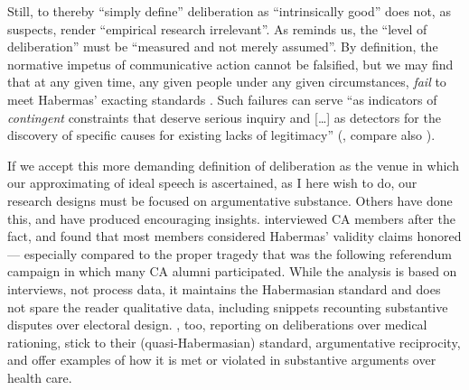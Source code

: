 Still, to thereby ``simply define'' deliberation as ``intrinsically good'' does not, as \citet[524]{Mutz2008} suspects, render ``empirical research irrelevant''.
As \citet[13]{Steiner2012} reminds us, the ``level of deliberation'' must be ``measured and not merely assumed''.
By definition, the normative impetus of communicative action cannot be falsified, but we may find that at any given time, any given people under any given circumstances, \emph{fail} to meet Habermas' exacting standards \citep[499]{Thompson2008}.
Such failures can serve ``as indicators of \emph{contingent} constraints that deserve serious inquiry and [\ldots] as detectors for the discovery of specific causes for existing lacks of legitimacy'' (\citealt[420, emphasis in original]{Habermas2006}, compare also \citealt[502]{Thompson2008}).

If we accept this more demanding definition of deliberation as the venue in which our approximating of ideal speech is ascertained, as I here wish to do, our research designs must be focused on argumentative substance.
Others have done this, and have produced encouraging insights. 
\cite{Ratner-2008-aa} interviewed \gls{CA} members after the fact, and found that most members considered Habermas' validity claims honored --- especially compared to the proper tragedy that was the following referendum campaign in which many \gls{CA} alumni participated.
While the analysis is based on interviews, not process data, it maintains the Habermasian standard and does not spare the reader qualitative data, including snippets recounting substantive disputes over electoral design.
\cite{GutmannThompson-2004-aa}, too, reporting on deliberations over medical rationing, stick to their (quasi-Habermasian) standard, argumentative reciprocity, and offer examples of how it is met or violated in substantive arguments over health care.

